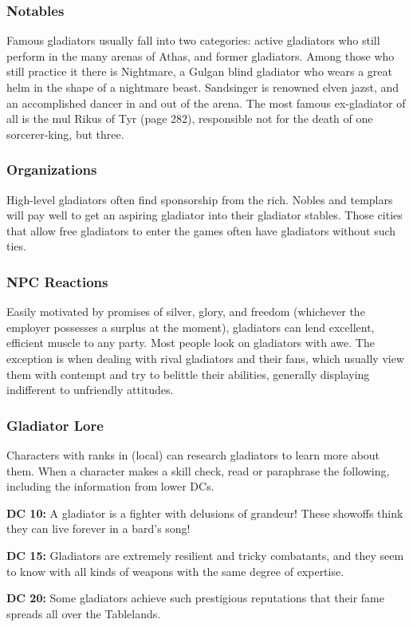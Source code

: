 \subsubsection{Notables}

Famous gladiators usually fall into two categories: active gladiators who still perform in the many arenas of Athas, and former gladiators. Among those who still practice it there is Nightmare, a Gulgan blind gladiator who wears a great helm in the shape of a nightmare beast. Sandsinger is renowned elven jazst, and an accomplished dancer in and out of the arena. The most famous ex-gladiator of all is the mul Rikus of Tyr (page 282), responsible not for the death of one sorcerer-king, but three.

\subsubsection{Organizations}

High-level gladiators often find sponsorship from the rich. Nobles and templars will pay well to get an aspiring gladiator into their gladiator stables. Those cities that allow free gladiators to enter the games often have gladiators without such ties.

\subsubsection{NPC Reactions}

Easily motivated by promises of silver, glory, and freedom (whichever the employer possesses a surplus at the moment), gladiators can lend excellent, efficient muscle to any party. Most people look on gladiators with awe. The exception is when dealing with rival gladiators and their fans, which usually view them with contempt and try to belittle their abilities, generally displaying indifferent to unfriendly attitudes.

\subsubsection{Gladiator Lore}

Characters with ranks in  (local) can research gladiators to learn more about them. When a character makes a skill check, read or paraphrase the following, including the information from lower DCs.

\textbf{DC 10:} A gladiator is a fighter with delusions of grandeur! These showoffs think they can live forever in a bard's song!

\textbf{DC 15:} Gladiators are extremely resilient and tricky combatants, and they seem to know with all kinds of weapons with the same degree of expertise.

\textbf{DC 20:} Some gladiators achieve such prestigious reputations that their fame spreads all over the Tablelands.
